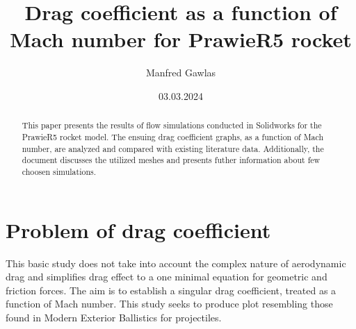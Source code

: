 \documentclass{article}
\title{Drag coefficient as a function of Mach number for PrawieR5 rocket}
\author{Manfred Gawlas}
\date{03.03.2024}
\begin{document}
\maketitle

\begin{comment}
	This documents shows resoults of flow simulations preformed in Solidworks on PrawieR5 rocket model. From those resoults graphs of drag coefficient as 		function of Mach number are then later analysed and compared to other in literature. Document also shows meshes and information about simulations.
\end{comment}

\begin{abstract}
	This paper presents the results of flow simulations conducted in Solidworks for the PrawieR5 rocket model. The ensuing drag coefficient graphs, as a 			function of Mach number, are analyzed and compared with existing literature data. Additionally, the document discusses the utilized meshes and 				presents futher information about few choosen simulations.
\end{abstract}

\printnomenclature

\section{Problem of drag coefficient}
	\begin{comment}
	This simple study will not take into account the complex nature of aerodynamic drag and will simplify drag effect to a simple equation for geometric and 		friction forces. This is to introduce a single drag coefficient, which we will treat as a function of Mach number. In that regard this study will strive to give 			similar plot to the ones for projectiles in Modern Exterior Ballistics.
	\end{comment}
	This basic study does not take into account the complex nature of aerodynamic drag and simplifies drag effect to a one minimal equation for geometric 			and friction forces. The aim is to establish a singular drag coefficient, treated as a function of Mach number. This study seeks to produce plot resembling 			those found in Modern Exterior Ballistics for projectiles.
\end{document}

